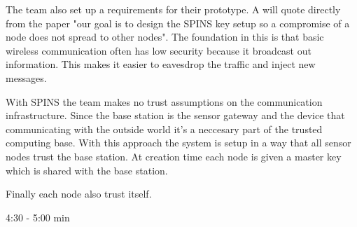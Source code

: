\tiny
The team also set up a requirements for their prototype. A will quote directly from the paper "our goal is to design the SPINS key setup so a compromise of a node does not spread to other nodes". The foundation in this is that basic wireless communication often has low security because it broadcast out information. 
This makes it easier to eavesdrop the traffic and inject new messages.

\bigskip


With SPINS the team makes no trust assumptions on the communication infrastructure. Since the base station is the sensor gateway and the device that communicating with the outside world it's a  neccesary part of the trusted computing base. With this approach the system is setup in a way that all sensor nodes trust the base station. At creation time each node is given a master key which is shared with the base station.

Finally each node also trust itself.

\Large{4:30 - 5:00 min}